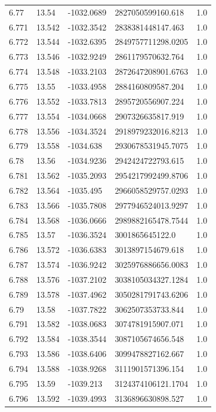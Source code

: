 \begin{tabular}{lllll}
6.77 & 13.54 & -1032.0689 & 2827050599160.618 & 1.0 \\
6.771 & 13.542 & -1032.3542 & 2838381448147.463 & 1.0 \\
6.772 & 13.544 & -1032.6395 & 2849757711298.0205 & 1.0 \\
6.773 & 13.546 & -1032.9249 & 2861179570632.764 & 1.0 \\
6.774 & 13.548 & -1033.2103 & 2872647208901.6763 & 1.0 \\
6.775 & 13.55 & -1033.4958 & 2884160809587.204 & 1.0 \\
6.776 & 13.552 & -1033.7813 & 2895720556907.224 & 1.0 \\
6.777 & 13.554 & -1034.0668 & 2907326635817.919 & 1.0 \\
6.778 & 13.556 & -1034.3524 & 2918979232016.8213 & 1.0 \\
6.779 & 13.558 & -1034.638 & 2930678531945.7075 & 1.0 \\
6.78 & 13.56 & -1034.9236 & 2942424722793.615 & 1.0 \\
6.781 & 13.562 & -1035.2093 & 2954217992499.8706 & 1.0 \\
6.782 & 13.564 & -1035.495 & 2966058529757.0293 & 1.0 \\
6.783 & 13.566 & -1035.7808 & 2977946524013.9297 & 1.0 \\
6.784 & 13.568 & -1036.0666 & 2989882165478.7544 & 1.0 \\
6.785 & 13.57 & -1036.3524 & 3001865645122.0 & 1.0 \\
6.786 & 13.572 & -1036.6383 & 3013897154679.618 & 1.0 \\
6.787 & 13.574 & -1036.9242 & 3025976886656.0083 & 1.0 \\
6.788 & 13.576 & -1037.2102 & 3038105034327.1284 & 1.0 \\
6.789 & 13.578 & -1037.4962 & 3050281791743.6206 & 1.0 \\
6.79 & 13.58 & -1037.7822 & 3062507353733.844 & 1.0 \\
6.791 & 13.582 & -1038.0683 & 3074781915907.071 & 1.0 \\
6.792 & 13.584 & -1038.3544 & 3087105674656.548 & 1.0 \\
6.793 & 13.586 & -1038.6406 & 3099478827162.667 & 1.0 \\
6.794 & 13.588 & -1038.9268 & 3111901571396.154 & 1.0 \\
6.795 & 13.59 & -1039.213 & 3124374106121.1704 & 1.0 \\
6.796 & 13.592 & -1039.4993 & 3136896630898.527 & 1.0 \\

\end{tabular}
